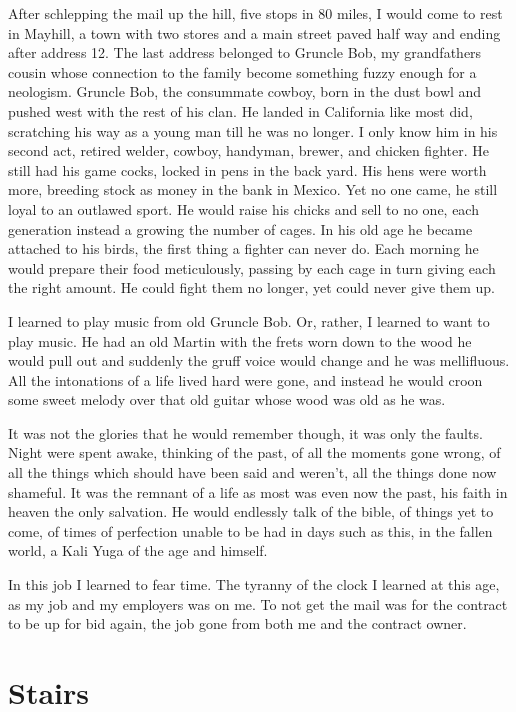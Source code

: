 \documentclass[ebook, 10pt, openright, onecolumn]{memoir}
\newcommand*\td[1]{
  \todo[inline]{
     #1 
  }
}
\newcommand*\finish{\td{ ----- Finish this section -----}}
\begin{document}
After schlepping the mail up the hill, five stops in 80 miles, I would come to
rest in Mayhill, a town with two stores and a main street paved half way and
ending after address 12.  The last address belonged to Gruncle Bob, my
grandfathers cousin whose connection to the family become something fuzzy enough
for a neologism.  Gruncle Bob, the consummate cowboy, born in the dust bowl and
pushed west with the rest of his clan.  He landed in California like most did,
scratching his way as a young man till he was no longer.  I only know him in his
second act, retired welder, cowboy, handyman, brewer, and chicken fighter.  He
still had his game cocks, locked in pens in the back yard.  His hens were worth
more, breeding stock as money in the bank in Mexico.  Yet no one came, he still
loyal to an outlawed sport.  He would raise his chicks and sell to no one, each
generation instead a growing the number of cages.  In his old age he became
attached to his birds, the first thing a fighter can never do.  Each morning he
would prepare their food meticulously, passing by each cage in turn giving each
the right amount.  He could fight them no longer, yet could never give them up.

I learned to play music from old Gruncle Bob.  Or, rather, I learned to want to play
music.  He had an old Martin with the frets worn down to the wood he would pull
out and suddenly the gruff voice would change and he was mellifluous.  All the
intonations of a life lived hard were gone, and instead he would croon some
sweet melody over that old guitar whose wood was old as he was.

It was not the glories that he would remember though, it was only the faults.
Night were spent awake, thinking of the past, of all the moments gone wrong, of
all the things which should have been said and weren't, all the things done now
shameful.  It was the remnant of a life as most was even now the past, his faith
in heaven the only salvation.  He would endlessly talk of the bible, of things
yet to come, of times of perfection unable to be had in days such as this, in
the fallen world, a Kali Yuga of the age and himself. 

\finish

In this job I learned to fear time.  The tyranny of the clock I learned at this
age, as my job and my employers was on me.  To not get the mail was for the
contract to be up for bid again, the job gone from both me and the contract
owner.
\finish

\chapter{Stairs}
\label{cha:stairs}
\end{document}
